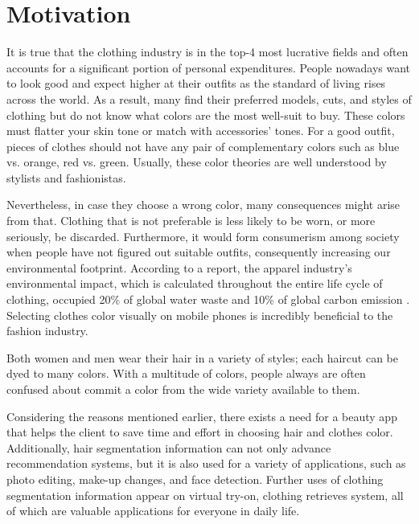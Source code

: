 \section{Motivation}
It is true that the clothing industry is in the top-4 most lucrative fields and often accounts for a significant portion of personal expenditures. People nowadays want to look good and expect higher at their outfits as the standard of living rises across the world. As a result, many find their preferred models, cuts, and styles of clothing but do not know what colors are the most well-suit to buy. These colors must flatter your skin tone or match with accessories’ tones. For a good outfit, pieces of clothes should not have any pair of complementary colors such as blue vs. orange, red vs. green. Usually, these color theories are well understood by stylists and fashionistas.
\par
Nevertheless, in case they choose a wrong color, many consequences might arise from that. Clothing that is not preferable is less likely to be worn, or more seriously, be discarded. Furthermore, it would form consumerism among society when people have not figured out suitable outfits, consequently increasing our environmental footprint. According to a report, the apparel industry's environmental impact, which is calculated throughout the entire life cycle of clothing, occupied 20\% of global water waste and 10\% of global carbon emission \cite{carbonemission}. Selecting clothes color visually on mobile phones is incredibly beneficial to the fashion industry.\par

Both women and men wear their hair in a variety of styles; each haircut can be dyed to many colors. With a multitude of colors, people always are often confused about commit a color from the wide variety available to them. 
\par
Considering the reasons mentioned earlier, there exists a need for a beauty app that helps the client to save time and effort in choosing hair and clothes color. Additionally, hair segmentation information can not only advance recommendation systems, but it is also used for a variety of applications, such as photo editing, make-up changes, and face detection. Further uses of clothing segmentation information appear on virtual try-on, clothing retrieves system, all of which are valuable applications for everyone in daily life.
\par